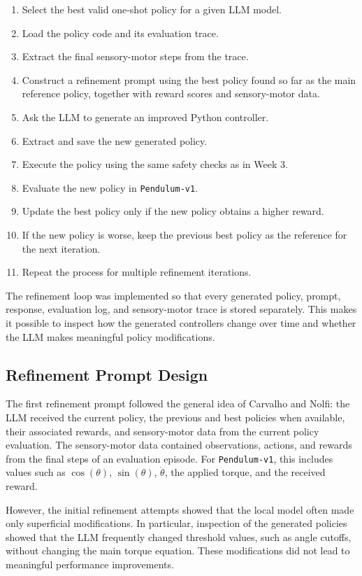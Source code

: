 \documentclass[11pt,a4paper]{article}
\begin{document}
\begin{enumerate}
\item Select the best valid one-shot policy for a given LLM model.
\item Load the policy code and its evaluation trace.
\item Extract the final sensory-motor steps from the trace.
\item Construct a refinement prompt using the best policy found so far as the main reference policy, together with reward scores and sensory-motor data.
\item Ask the LLM to generate an improved Python controller.
\item Extract and save the new generated policy.
\item Execute the policy using the same safety checks as in Week 3.
\item Evaluate the new policy in \texttt{Pendulum-v1}.
\item Update the best policy only if the new policy obtains a higher reward.
\item If the new policy is worse, keep the previous best policy as the reference for the next iteration.
\item Repeat the process for multiple refinement iterations.
\end{enumerate}

The refinement loop was implemented so that every generated policy, prompt, response, evaluation log, and sensory-motor trace is stored separately. This makes it possible to inspect how the generated controllers change over time and whether the LLM makes meaningful policy modifications.

\subsection{Refinement Prompt Design}

The first refinement prompt followed the general idea of Carvalho and Nolfi: the LLM received the current policy, the previous and best policies when available, their associated rewards, and sensory-motor data from the current policy evaluation. The sensory-motor data contained observations, actions, and rewards from the final steps of an evaluation episode. For \texttt{Pendulum-v1}, this includes values such as $\cos(\theta)$, $\sin(\theta)$, $\dot{\theta}$, the applied torque, and the received reward.

However, the initial refinement attempts showed that the local model often made only superficial modifications. In particular, inspection of the generated policies showed that the LLM frequently changed threshold values, such as angle cutoffs, without changing the main torque equation. These modifications did not lead to meaningful performance improvements.
\end{document}
